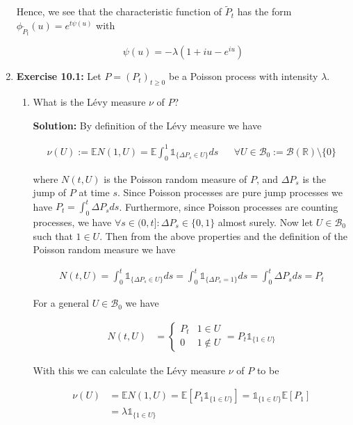 \documentclass[12pt, a4paper]{article}
\begin{document}
\begin{enumerate}
        Hence, we see that the characteristic function of $\tilde P_t$ has the form $\phi_{\tilde P_t}(u) = e^{t\psi(u)}$ with 

        $$\psi(u) = -\lambda(1+iu-e^{iu})$$

        \item \textbf{Exercise 10.1:} Let $P = (P_t)_{t\ge 0}$ be a Poisson process with intensity $\lambda$. 
        
        \begin{enumerate}
            \item What is the Lévy measure $\nu$ of $P$? 
            
            \textbf{Solution:} By definition of the Lévy measure we have

            \begin{align*}
                \nu(U) := \mathbb E N(1,U)  =\mathbb E \int_0^1 \mathds 1_{\{\Delta P_s \in U\}}ds && \forall U \in \mathcal B_0 := \mathcal B(\mathbb R) \setminus \{0\}
            \end{align*}

            where $N(t,U)$ is the Poisson random measure of $P$, and  $\Delta P_s$ is the jump of $P$ at time $s$. Since Poisson processes are pure jump processes we have $P_t = \int_0^t \Delta P_s ds$. Furthermore, since Poisson processes are counting processes, we have $\forall s \in (0,t]: \Delta P_s \in \{0, 1\}$ almost surely. Now let $U \in \mathcal B_0$ such that $1 \in U$. Then from the above properties and the definition of the Poisson random measure we have

            \begin{align*}
                N(t,U) = \int_0^t \mathds 1_{\{\Delta P_s \in U \}} ds = \int_0^t \mathds 1_{\{\Delta P_s = 1\}} ds = \int_0^t \Delta P_s ds = P_t
            \end{align*}

            For a general $U \in \mathcal B_0$ we have

            \begin{align*}
                N(t, U) &= \begin{cases} P_t & 1 \in U \\ 0 & 1 \notin U \end{cases} = P_t \mathds 1_{\{1 \in U\}}
            \end{align*}

            With this we can calculate the Lévy measure $\nu$ of $P$ to be

            \begin{align*}
                \nu(U) &= \mathbb E N(1, U) = \mathbb E [P_1 \mathds 1_{\{ 1 \in U \}}] = \mathds 1_{\{ 1 \in U \}} \mathbb E [P_1] \\
                &= \lambda \mathds 1_{\{ 1 \in U \}}
            \end{align*}


\end{enumerate}
\end{enumerate}
\end{document}

